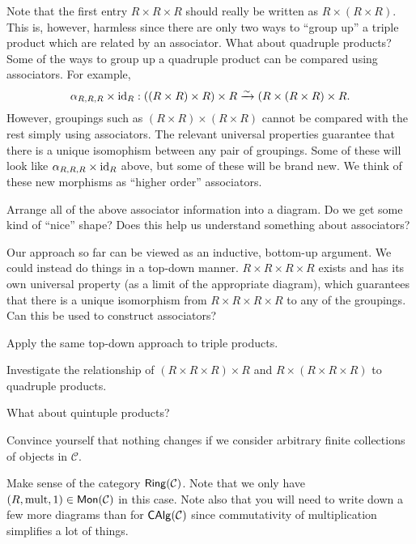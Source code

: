 \documentclass[11pt]{article}
\renewcommand{\C}{\mathcal{C}}
\DeclareMathOperator{\mult}{mult} %
\begin{document}
\begin{exercise}
Note that the first entry $R\times R\times R$ should really be written as $R\times(R\times R)$. This is, however, harmless since there are only two ways to ``group up'' a triple product which are related by an associator. What about quadruple products? Some of the ways to group up a quadruple product can be compared using associators. For example, 
$$\alpha_{R,R,R}\times\operatorname{id}_R: ((R\times R)\times R)\times R\xrightarrow{\sim}(R\times(R\times R)\times R.$$
However, groupings such as $(R\times R)\times(R\times R)$ cannot be compared with the rest simply using associators. The relevant universal properties guarantee that there is a unique isomophism between any pair of groupings. Some of these will look like $\alpha_{R,R,R}\times\operatorname{id}_R$ above, but some of these will be brand new. We think of these new morphisms as ``higher order'' associators.
\begin{enum}{\alph}
\item Arrange all of the above associator information into a diagram. Do we get some kind of ``nice'' shape? Does this help us understand something about associators?

\item Our approach so far can be viewed as an inductive, bottom-up argument. We could instead do things in a top-down manner. $R\times R\times R\times R$ exists and has its own universal property (as a limit of the appropriate diagram), which guarantees that there is a unique isomorphism from $R\times R\times R\times R$ to any of the groupings. Can this be used to construct associators?

\item Apply the same top-down approach to triple products.

\item Investigate the relationship of $(R\times R\times R)\times R$ and $R\times(R\times R\times R)$ to quadruple products.

\item What about quintuple products?

\item Convince yourself that nothing changes if we consider arbitrary finite collections of objects in $\C$.
\end{enum}
\end{exercise}

\begin{exercise}
Make sense of the category $\Ring(\C)$. Note that we only have $(R,\mult,1)\in\Mon(\C)$ in this case. Note also that you will need to write down a few more diagrams than for $\CAlg(\C)$ since commutativity of multiplication simplifies a lot of things. 
\end{exercise}
\end{document}
